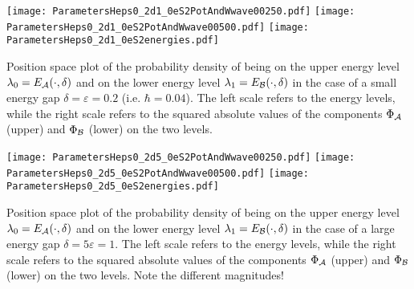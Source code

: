 \documentclass[b0paper,portrait,fontscale=0.24]{baposter}
\begin{document}
\begin{poster}
{    \centerline{
      \texttt{[image: ParametersHeps0\_2d1\_0eS2PotAndWwave00250.pdf]}
      \texttt{[image: ParametersHeps0\_2d1\_0eS2PotAndWwave00500.pdf]}
      \texttt{[image: ParametersHeps0\_2d1\_0eS2energies.pdf]}
    }
    { Position space plot of the probability density of being on the upper energy level
      $\lambda_{0} = E_{\cal A}(\cdot,\delta)$ and on the lower energy level
      $\lambda_{1} = E_{\cal B}(\cdot,\delta)$ in the case of a small energy gap
      $\delta=\varepsilon=0.2$ (i.e. $\hbar = 0.04$). The left scale refers to the energy
      levels, while the right scale refers to the squared absolute values of the components
      $\Phi_{\cal A}$ (upper) and $\Phi_{\cal B}$ (lower) on the two levels.}
    \centerline{
      \texttt{[image: ParametersHeps0\_2d5\_0eS2PotAndWwave00250.pdf]}
      \texttt{[image: ParametersHeps0\_2d5\_0eS2PotAndWwave00500.pdf]}
      \texttt{[image: ParametersHeps0\_2d5\_0eS2energies.pdf]}
    }
    { Position space plot  of the probability density of being on the upper energy level
      $\lambda_{0} = E_{\cal A}(\cdot,\delta)$ and on the lower energy level
      $\lambda_{1} = E_{\cal B}(\cdot,\delta)$ in the case of a large energy gap
      $\delta=5\varepsilon=1$. The left scale refers to the energy levels, while the right
      scale refers to the squared absolute values of the components $\Phi_{\cal A}$ (upper)
      and $\Phi_{\cal B}$ (lower) on the two levels. Note the different magnitudes!}
  }

\end{poster}
\end{document}

